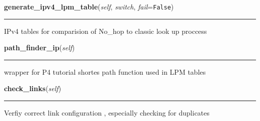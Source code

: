     \label{make_topology:topo_tracker:generate_ipv4_lpm_table}

    \vspace{0.5ex}

\hspace{.8\funcindent}\begin{boxedminipage}{\funcwidth}

    \raggedright \textbf{generate\_ipv4\_lpm\_table}(\textit{self}, \textit{switch}, \textit{fail}={\tt False})

    \vspace{-1.5ex}

    \rule{\textwidth}{0.5\fboxrule}
\setlength{\parskip}{2ex}
    IPv4 tables for comparision of No\_hop to classic look up proccess

\setlength{\parskip}{1ex}
    \end{boxedminipage}

    \label{make_topology:topo_tracker:path_finder_ip}

    \vspace{0.5ex}

\hspace{.8\funcindent}\begin{boxedminipage}{\funcwidth}

    \raggedright \textbf{path\_finder\_ip}(\textit{self})

    \vspace{-1.5ex}

    \rule{\textwidth}{0.5\fboxrule}
\setlength{\parskip}{2ex}
    wrapper for P4 tutorial shortes path function used in LPM tables

\setlength{\parskip}{1ex}
    \end{boxedminipage}

    \label{make_topology:topo_tracker:check_links}

    \vspace{0.5ex}

\hspace{.8\funcindent}\begin{boxedminipage}{\funcwidth}

    \raggedright \textbf{check\_links}(\textit{self})

    \vspace{-1.5ex}

    \rule{\textwidth}{0.5\fboxrule}
\setlength{\parskip}{2ex}
    Verfiy correct link configuration , especially checking for duplicates

\setlength{\parskip}{1ex}
    \end{boxedminipage}

